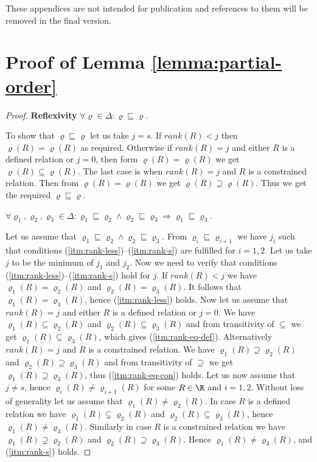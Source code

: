 These appendices are not intended for publication and references to
them will be removed in the final version.

\section{Proof of Lemma \ref{lemma:partial-order}}\label{proof:lemma:partial-order}

\begin{proof}

{\bf Reflexivity} $\forall \varrho \in \Delta: \varrho \sqsubseteq \varrho$.

\noindent To show that $\varrho \sqsubseteq \varrho$ let us take $j =
s$. If $rank(R)<j$ then $\varrho(R)=\varrho(R)$ as required. Otherwise
if $rank(R)=j$ and either $R$ is a defined relation or $j=0$, then
form $\varrho(R)=\varrho(R)$ we get $\varrho(R) \subseteq
\varrho(R)$. The last case is when $rank(R)=j$ and $R$ is a
constrained relation. Then from $\varrho(R) = \varrho(R)$ we get
$\varrho(R) \supseteq \varrho(R)$. Thus we get the required $\varrho
\sqsubseteq \varrho$.

 $\forall \varrho_1, \varrho_2, \varrho_3
\in \Delta: \varrho_1 \sqsubseteq \varrho_2 \wedge \varrho_2
\sqsubseteq \varrho_3 \Rightarrow \varrho_1 \sqsubseteq \varrho_3$.

\noindent Let us assume that $\varrho_1 \sqsubseteq \varrho_2 \wedge
\varrho_2 \sqsubseteq \varrho_3$. From $\varrho_i \sqsubseteq
\varrho_{i+1}$ we have $j_i$ such that conditions
(\ref{itm:rank-less})--(\ref{itm:rank-s}) are fulfilled for
$i=1,2$. Let us take $j$ to be the minimum of $j_1$ and $j_2$. Now we
need to verify that conditions
(\ref{itm:rank-less})--(\ref{itm:rank-s}) hold for $j$. If $rank(R)<j$
we have $\varrho_1(R) = \varrho_2(R)$ and $\varrho_2(R) =
\varrho_3(R)$. It follows that $\varrho_1(R) = \varrho_3(R)$, hence
(\ref{itm:rank-less}) holds. Now let us assume that $rank(R)=j$ and
either $R$ is a defined relation or $j=0$. We have $\varrho_1(R)
\subseteq \varrho_2(R)$ and $\varrho_2(R) \subseteq \varrho_3(R)$ and
from transitivity of $\subseteq$ we get $\varrho_1(R) \subseteq
\varrho_3(R)$, which gives (\ref{itm:rank-eq-def}). Alternatively
$rank(R)=j$ and $R$ is a constrained relation. We have $\varrho_1(R)
\supseteq \varrho_2(R)$ and $\varrho_2(R) \supseteq \varrho_3(R)$ and
from transitivity of $\supseteq$ we get $\varrho_1(R) \supseteq
\varrho_3(R)$, thus (\ref{itm:rank-eq-con}) holds. Let us now assume
that $j \neq s$, hence $\varrho_i(R) \neq \varrho_{i+1}(R)$ for some
$R \in \R$ and $i=1,2$. Without loss of generality let us assume that
$\varrho_1(R) \neq \varrho_2(R)$. In case $R$ is a defined relation we
have $\varrho_1(R) \subsetneq \varrho_2(R)$ and $\varrho_2(R)
\subseteq \varrho_3(R)$, hence $\varrho_1(R) \neq
\varrho_3(R)$. Similarly in case $R$ is a constrained relation we have
$\varrho_1(R) \supsetneq \varrho_2(R)$ and $\varrho_2(R) \supseteq
\varrho_3(R)$. Hence $\varrho_1(R) \neq \varrho_3(R)$, and
(\ref{itm:rank-s}) holds.


\end{proof}
